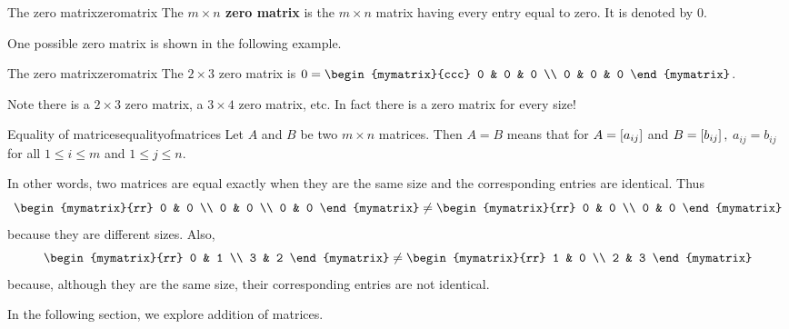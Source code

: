 \begin{definition}{The zero matrix}{zeromatrix}
The \textbf{$m\times n$ zero matrix} is the $m\times n$ matrix
having every entry equal to zero. It is denoted by $0.$
\end{definition}

One possible zero matrix is shown in the following example.

\begin{example}{The zero matrix}{zeromatrix}
The $2\times 3$ zero matrix is $0= \begin{mymatrix}{ccc}
0 & 0 & 0 \\
0 & 0 & 0
\end{mymatrix} $.
\end{example}

Note there is a $2\times 3$ zero matrix, a $3\times 4$ zero matrix, etc. In
fact there is a zero matrix for every size! 

\begin{definition}{Equality of matrices}{equalityofmatrices}
 Let $A$ and $B$ be two $m \times n$ matrices. Then $A=B$ means
that for $A=\left[a_{ij}\right] $
and $B=\left[b_{ij}\right] ,$ $a_{ij}=b_{ij}$ for all $1\leq i\leq m$ and 
$1\leq j\leq n.$
\end{definition}

In other words, two matrices are equal exactly when they are the same size and the
corresponding entries are identical. Thus
\begin{equation*}
\begin{mymatrix}{rr}
0 & 0 \\
0 & 0 \\
0 & 0
\end{mymatrix} \neq \begin{mymatrix}{rr}
0 & 0 \\
0 & 0
\end{mymatrix}
\end{equation*}
because they are different sizes. 
Also,
\begin{equation*}
\begin{mymatrix}{rr}
0 & 1 \\
3 & 2 
\end{mymatrix} \neq \begin{mymatrix}{rr}
1 & 0 \\
2 & 3
\end{mymatrix}
\end{equation*}
because, although they are the same size, their corresponding entries are not identical.

In the following section, we explore addition of matrices. 
